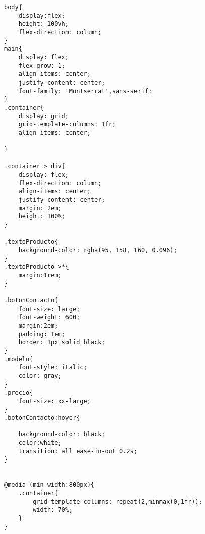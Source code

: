 \clearpage
\begin{lstlisting}[caption=PaginaProducto.css (LMSI)]
body{
    display:flex;
    height: 100vh;
    flex-direction: column;
}
main{
    display: flex;
    flex-grow: 1;
    align-items: center;
    justify-content: center;
    font-family: 'Montserrat',sans-serif; 
}
.container{
    display: grid;
    grid-template-columns: 1fr;
    align-items: center;
    
}

.container > div{
    display: flex;
    flex-direction: column;
    align-items: center;
    justify-content: center;
    margin: 2em;
    height: 100%;
}

.textoProducto{
    background-color: rgba(95, 158, 160, 0.096);
}
.textoProducto >*{
    margin:1rem;
}

.botonContacto{
    font-size: large;
    font-weight: 600;
    margin:2em;
    padding: 1em;
    border: 1px solid black;
}
.modelo{
    font-style: italic;
    color: gray;
}
.precio{
    font-size: xx-large;
}
.botonContacto:hover{
    
    background-color: black;
    color:white;
    transition: all ease-in-out 0.2s;
}


@media (min-width:800px){
    .container{
        grid-template-columns: repeat(2,minmax(0,1fr));
        width: 70%;
    }
}
\end{lstlisting}
\clearpage